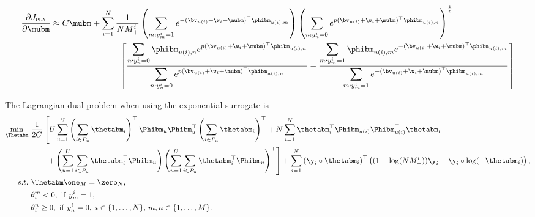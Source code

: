 \begin{equation*}
\begin{aligned}
%
\frac{\partial J_\textsc{pla}}{\partial \mubm}
&\approx C \mubm
  + \sum_{i=1}^N \frac{1}{N M_+^i} 
    \left( \sum_{m: y_m^i = 1} e^{-(\bv_{u(i)} + \w_i + \mubm)^\top \phibm_{u(i),m}} \right)
    \left( \sum_{n: y_n^i = 0} e^{p (\bv_{u(i)} + \w_i + \mubm)^\top \phibm_{u(i),n}} \right)^\frac{1}{p} \\
& \hspace{8em} \left[ 
    \frac{ \displaystyle \sum_{n: y_n^i = 0} \phibm_{u(i),n} e^{p (\bv_{u(i)} + \w_i + \mubm)^\top \phibm_{u(i),n}} }
         { \displaystyle \sum_{n: y_n^i = 0} e^{p (\bv_{u(i)} + \w_i + \mubm)^\top \phibm_{u(i),n}} }
    - \frac{ \displaystyle \sum_{m: y_m^i = 1} \phibm_{u(i),m} e^{-(\bv_{u(i)} + \w_i + \mubm)^\top \phibm_{u(i),m}} }
           { \displaystyle \sum_{m: y_m^i = 1} e^{-(\bv_{u(i)} + \w_i + \mubm)^\top \phibm_{u(i),m}} } \right]
\end{aligned}
\end{equation*}


The Lagrangian dual problem when using the exponential surrogate is
\begin{equation}
\label{eq:dual_pla}
\begin{aligned}
\min_{\Thetabm} \ & \frac{1}{2 C} \left[
     U \sum_{u=1}^U \left( \sum_{i \in P_u} \thetabm_i \right)^\top \Phibm_u \Phibm_u^\top \left( \sum_{i \in P_u} \thetabm_i \right)^\top
   + N \sum_{i=1}^N \thetabm_i^\top \Phibm_{u(i)} \Phibm_{u(i)}^\top \thetabm_i \right. \\
& \hspace{2em} \left.
   + \left( \sum_{u=1}^U \sum_{i \in P_u} \thetabm_i^\top \Phibm_u \right)
     \left( \sum_{u=1}^U \sum_{i \in P_u} \thetabm_i^\top \Phibm_u \right)^\top \right]
   + \sum_{i=1}^N \left( \y_i \circ \thetabm_i \right)^\top 
     \left( (1 - \log(N M_+^i)) \y_i - \y_i \circ \log(-\thetabm_i) \right), \\
s.t. \ 
& \Thetabm \one_M = \zero_N, \\
&\theta_i^m < 0, \ \mathrm{if} \ y_m^i = 1, \\
&\theta_i^n \ge 0, \ \mathrm{if} \ y_n^i = 0, \ i \in \{1,\dots,N\}, \, m,n \in \{1,\dots,M\}.
\end{aligned}
\end{equation}

